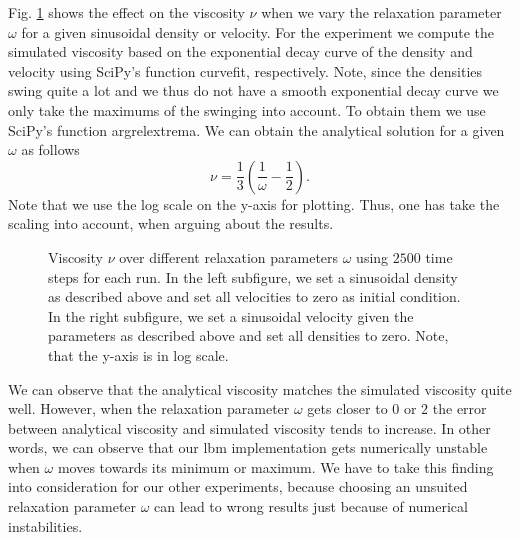 \documentclass[a4paper,11pt, footsepline]{book}
\begin{document}
Fig. \ref{fig:omega_vs_viscosity} shows the effect on the viscosity $\nu$ when we vary the relaxation parameter $\omega$ for a given sinusoidal density or velocity. For the experiment we compute the simulated viscosity based on the exponential decay curve of the density and velocity using SciPy's function \textsf{curve\textunderscore fit}, respectively. Note, since the densities swing quite a lot and we thus do not have a smooth exponential decay curve we only take the maximums of the swinging into account. To obtain them we use SciPy's function \textsf{argrelextrema}. We can obtain the analytical solution for a given $\omega$ as follows
\begin{equation}
\nu = \frac{1}{3}(\frac{1}{\omega}-\frac{1}{2}).
\end{equation}
Note that we use the log scale on the y-axis for plotting. Thus, one has take the scaling into account, when arguing about the results.

\begin{figure}
  \begin{center}
	\scalebox{0.7}{}
   \caption{Viscosity $\nu$ over different relaxation parameters $\omega$ using $2500$ time steps for each run. In the left subfigure, we set a sinusoidal density as described above and set all velocities to zero as initial condition. In the right subfigure, we set a sinusoidal velocity given the parameters as described above and set all densities to zero. Note, that the y-axis is in log scale.}
  \label{fig:omega_vs_viscosity}
  \end{center}
\end{figure}
We can observe that the analytical viscosity matches the simulated viscosity quite well. However, when the relaxation parameter $\omega$ gets closer to $0$ or $2$ the error between analytical viscosity and simulated viscosity tends to increase. In other words, we can observe that our \ac{lbm} implementation gets numerically unstable when $\omega$ moves towards its minimum or maximum. We have to take this finding into consideration for our other experiments, because choosing an unsuited relaxation parameter $\omega$ can lead to wrong results just because of numerical instabilities.
\end{document}
